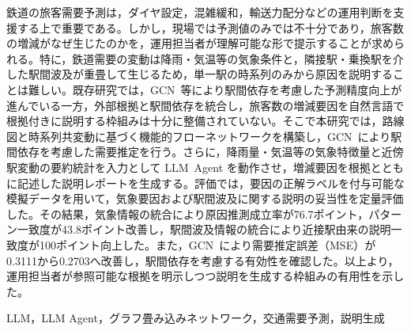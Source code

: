 \documentclass[technicalreport]{ieicej}
\newcommand{\LLM}{LLM}
\newcommand{\GCN}{GCN}
\begin{document}
\begin{jabstract}
鉄道の旅客需要予測は，ダイヤ設定，混雑緩和，輸送力配分などの運用判断を支援する上で重要である。しかし，現場では予測値のみでは不十分であり，旅客数の増減がなぜ生じたのかを，運用担当者が理解可能な形で提示することが求められる。特に，鉄道需要の変動は降雨・気温等の気象条件と，隣接駅・乗換駅を介した駅間波及が重畳して生じるため，単一駅の時系列のみから原因を説明することは難しい。既存研究では，\GCN\ 等により駅間依存を考慮した予測精度向上が進んでいる一方，外部根拠と駅間依存を統合し，旅客数の増減要因を自然言語で根拠付きに説明する枠組みは十分に整備されていない。そこで本研究では，路線図と時系列共変動に基づく機能的フローネットワークを構築し，\GCN\ により駅間依存を考慮した需要推定を行う。さらに，降雨量・気温等の気象特徴量と近傍駅変動の要約統計を入力として \LLM\ Agent を動作させ，増減要因を根拠とともに記述した説明レポートを生成する。評価では，要因の正解ラベルを付与可能な模擬データを用いて，気象要因および駅間波及に関する説明の妥当性を定量評価した。その結果，気象情報の統合により原因推測成立率が76.7ポイント，パターン一致度が43.8ポイント改善し，駅間波及情報の統合により近接駅由来の説明一致度が100ポイント向上した。また，\GCN\ により需要推定誤差（MSE）が0.3111から0.2703へ改善し，駅間依存を考慮する有効性を確認した。以上より，運用担当者が参照可能な根拠を明示しつつ説明を生成する枠組みの有用性を示した。
\end{jabstract}

\begin{jkeyword}
LLM，LLM Agent，グラフ畳み込みネットワーク，交通需要予測，説明生成
\end{jkeyword}
\end{document}
